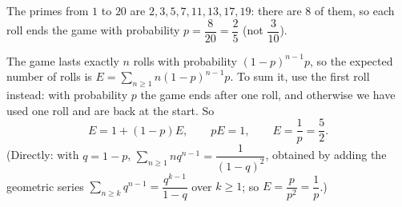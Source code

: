 The primes from $1$ to $20$ are $2,3,5,7,11,13,17,19$: there are $8$ of them, so each roll ends the game with probability $p=\dfrac{8}{20}=\dfrac{2}{5}$ (not $\dfrac{3}{10}$).

The game lasts exactly $n$ rolls with probability $(1-p)^{n-1}p$, so the expected number of rolls is $E=\displaystyle\sum_{n\ge1}n(1-p)^{n-1}p$. To sum it, use the first roll instead: with probability $p$ the game ends after one roll, and otherwise we have used one roll and are back at the start. So
\[
E=1+(1-p)E,\qquad pE=1,\qquad E=\dfrac{1}{p}=\boxed{\dfrac{5}{2}}.
\]
(Directly: with $q=1-p$, $\displaystyle\sum_{n\ge1}nq^{n-1}=\dfrac{1}{(1-q)^2}$, obtained by adding the geometric series $\displaystyle\sum_{n\ge k}q^{n-1}=\dfrac{q^{k-1}}{1-q}$ over $k\ge1$; so $E=\dfrac{p}{p^2}=\dfrac{1}{p}$.)
